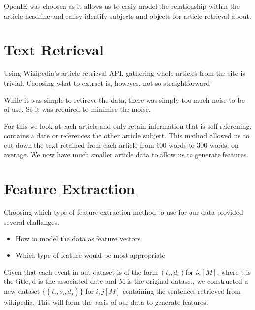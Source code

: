 \documentclass[12pt]{report}
\begin{document}
        OpenIE was choosen as it allows us to easiy model the relationship within the article headline
        and ealisy identify subjects and objects for article retrieval about.

        \section{Text Retrieval} %
        Using Wikipedia's article retrieval API, gathering whole articles from
        the site is trivial. Choosing what to extract is, however, not
        so straightforward

        While it was simple to retireve the data, there was simply too much noise to be of use.
        So it was required to minimise the moise.

        For this we look at each article and only retain information that is self referening, contains
        a date or references the other article subject.
        This method allowed us to cut down the text retained from each article from 600 words \cite{WikiStats}
        to 300 words, on average. %
        We now have much smaller article data to allow us to generate features.


        \section{Feature Extraction}
                Choosing which type of feature extraction method to use for our data provided several challanges.
                \begin{itemize}
                \item How to model the data as feature vectors
                \item Which type of feature would be most appropriate
                \end{itemize}

                \noindent Given that each event in out dataset is of the form $(t_{i},d_{i}) $for $ i \epsilon [M]$,
                where t is the title, d is the associated date and M is the original dataset,
                we constructed a new dataset $\{(t_{i},s_{i},d_{j})\}$ for $i,j [M]$ containing
                the sentences retrieved from wikipedia. This will form the basis of our data to generate
                features.
\end{document}

